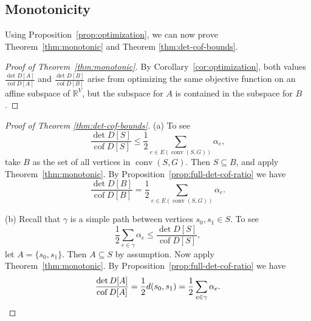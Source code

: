 \documentclass[12pt]{amsart}
\theoremstyle{definition}
\newcommand{\RR}{\mathbb{R}}
\DeclareMathOperator{\cof}{cof}
\DeclareMathOperator{\conv}{conv}
\begin{document}
\subsection{Monotonicity}


Using Proposition~\ref{prop:optimization}, we can now prove Theorem~\ref{thm:monotonic} and Theorem \ref{thm:det-cof-bounds}.

\begin{proof}[Proof of Theorem~\ref{thm:monotonic}]
By Corollary~\ref{cor:optimization}, both values 
$\displaystyle
	\frac{\det D[A]}{\cof D[A]}
$ 
and
$\displaystyle
	\frac{\det D[B]}{\cof D[B]}
$
arise from optimizing the same objective function on an affine subspace of $\RR^V$, 
but the subspace for $A$ is contained in the subspace for $B$.
\end{proof}

\begin{proof}[Proof of Theorem \ref{thm:det-cof-bounds}]
(a)
To see
\begin{equation*}
	\frac{\det D[S]}{\cof D[S]} \leq \frac12 \sum_{e \in E(\conv(S, G))} \alpha_e ,
\end{equation*}
take $B$ as the set of all vertices in $\conv(S, G)$.
Then $S \subseteq B$, and apply Theorem~\ref{thm:monotonic}.
By Proposition~\ref{prop:full-det-cof-ratio} we have
\[
	\frac{\det D[B]}{\cof D[B]} = \frac12 \sum_{e \in E(\conv(S, G))} \alpha_e .
\]

(b) 
Recall that $\gamma$ is a simple path between vertices $s_0, s_1 \in S$.
To see
\begin{equation*}
	\frac12 \sum_{e \in \gamma} \alpha_e \leq \frac{\det D[S]}{\cof D[S]},
\end{equation*}
let $A=\{s_0, s_1\}$.
Then $A \subseteq S$ by assumption. Now apply Theorem~\ref{thm:monotonic}.
By Proposition~\ref{prop:full-det-cof-ratio} we have
\[
	\frac{\det D[A]}{\cof D[A]}
	= \frac12 d(s_0, s_1) 
	= \frac12 \sum_{e \in \gamma} \alpha_e .
	\qedhere
\]
\end{proof}
\end{document}

